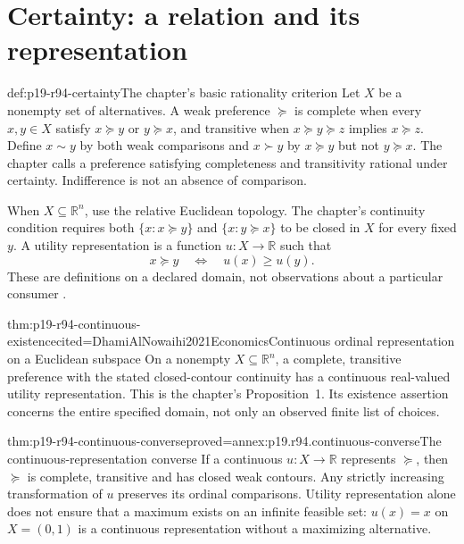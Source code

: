 \section{Certainty: a relation and its representation}
\label{sec:p19-r94-certainty}

\begin{hbdefinition}{def:p19-r94-certainty}{The chapter's basic rationality criterion}
Let \(X\) be a nonempty set of alternatives. A weak preference
\(\succeq\) is complete when every \(x,y\in X\) satisfy
\(x\succeq y\) or \(y\succeq x\), and transitive when
\(x\succeq y\succeq z\) implies \(x\succeq z\).
Define \(x\sim y\) by both weak comparisons and \(x\succ y\)
by \(x\succeq y\) but not \(y\succeq x\).
The chapter calls a preference satisfying completeness and transitivity
rational under certainty. Indifference is not an absence of comparison.

When \(X\subseteq\mathbb R^n\), use the relative Euclidean topology.
The chapter's continuity condition requires both
\(\{x:x\succeq y\}\) and \(\{x:y\succeq x\}\) to be closed
in \(X\) for every fixed \(y\). A utility representation is a function
\(u:X\to\mathbb R\) such that
\[
                 x\succeq y\quad\Longleftrightarrow\quad u(x)\geq u(y).
\]
These are definitions on a declared domain, not observations about a
particular consumer \cite[pp.~565--566]{DhamiAlNowaihi2021Economics}.
\end{hbdefinition}

\begin{hbtheorem}{thm:p19-r94-continuous-existence}{cited=DhamiAlNowaihi2021Economics}{Continuous ordinal representation on a Euclidean subspace}
On a nonempty \(X\subseteq\mathbb R^n\), a complete, transitive
preference with the stated closed-contour continuity has a continuous
real-valued utility representation. This is the chapter's Proposition~1.
Its existence assertion concerns the entire specified domain, not only
an observed finite list of choices.
\end{hbtheorem}

\begin{hbtheorem}{thm:p19-r94-continuous-converse}{proved=annex:p19.r94.continuous-converse}{The continuous-representation converse}
If a continuous \(u:X\to\mathbb R\) represents \(\succeq\),
then \(\succeq\) is complete, transitive and has closed weak contours.
Any strictly increasing transformation of \(u\) preserves its ordinal
comparisons. Utility representation alone does not ensure that a maximum
exists on an infinite feasible set: \(u(x)=x\) on \(X=(0,1)\)
is a continuous representation without a maximizing alternative.
\end{hbtheorem}

